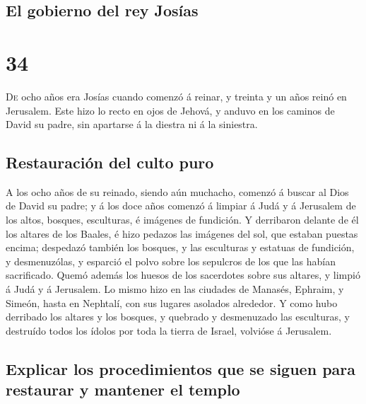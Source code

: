 \hypertarget{el-gobierno-del-rey-josuxedas}{%
\subsection{El gobierno del rey
Josías}\label{el-gobierno-del-rey-josuxedas}}

\hypertarget{section-14-34}{%
\section{34}\label{section-14-34}}

 \textsc{De} ocho años era Josías cuando comenzó á reinar,
y treinta y un años reinó en Jerusalem.  Este hizo lo
recto en ojos de Jehová, y anduvo en los caminos de David su padre, sin
apartarse á la diestra ni á la siniestra.

\hypertarget{restauraciuxf3n-del-culto-puro}{%
\subsection{Restauración del culto
puro}\label{restauraciuxf3n-del-culto-puro}}

 A los ocho años de su reinado, siendo aún muchacho,
comenzó á buscar al Dios de David su padre; y á los doce años comenzó á
limpiar á Judá y á Jerusalem de los altos, bosques, esculturas, é
imágenes de fundición.  Y derribaron delante de él los
altares de los Baales, é hizo pedazos las imágenes del sol, que estaban
puestas encima; despedazó también los bosques, y las esculturas y
estatuas de fundición, y desmenuzólas, y esparció el polvo sobre los
sepulcros de los que las habían sacrificado.  Quemó además
los huesos de los sacerdotes sobre sus altares, y limpió á Judá y á
Jerusalem.  Lo mismo hizo en las ciudades de Manasés,
Ephraim, y Simeón, hasta en Nephtalí, con sus lugares asolados
alrededor.  Y como hubo derribado los altares y los
bosques, y quebrado y desmenuzado las esculturas, y destruído todos los
ídolos por toda la tierra de Israel, volvióse á Jerusalem.

\hypertarget{explicar-los-procedimientos-que-se-siguen-para-restaurar-y-mantener-el-templo}{%
\subsection{Explicar los procedimientos que se siguen para restaurar y
mantener el
templo}\label{explicar-los-procedimientos-que-se-siguen-para-restaurar-y-mantener-el-templo}}

